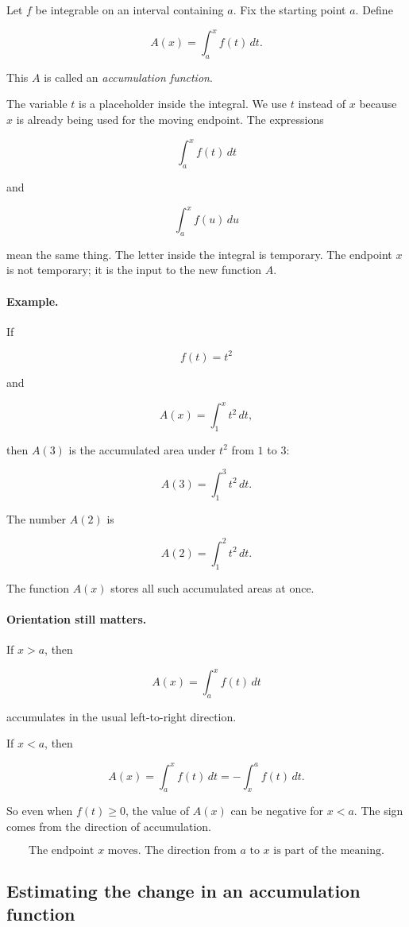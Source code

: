 Let \(f\) be integrable on an interval containing \(a\).  Fix the starting point \(a\).  Define

\[
\boxed{
A(x)=\int_a^x f(t)\,dt.
}
\]

This \(A\) is called an \emph{accumulation function}.

The variable \(t\) is a placeholder inside the integral.  We use \(t\) instead of \(x\)
because \(x\) is already being used for the moving endpoint.  The expressions

\[
\int_a^x f(t)\,dt
\]

and

\[
\int_a^x f(u)\,du
\]

mean the same thing.  The letter inside the integral is temporary.  The endpoint \(x\)
is not temporary; it is the input to the new function \(A\).

\paragraph{Example.}
If

\[
f(t)=t^2
\]

and

\[
A(x)=\int_1^x t^2\,dt,
\]

then \(A(3)\) is the accumulated area under \(t^2\) from \(1\) to \(3\):

\[
A(3)=\int_1^3 t^2\,dt.
\]

The number \(A(2)\) is

\[
A(2)=\int_1^2 t^2\,dt.
\]

The function \(A(x)\) stores all such accumulated areas at once.

\paragraph{Orientation still matters.}
If \(x>a\), then

\[
A(x)=\int_a^x f(t)\,dt
\]

accumulates in the usual left-to-right direction.

If \(x<a\), then

\[
A(x)=\int_a^x f(t)\,dt
=
-\int_x^a f(t)\,dt.
\]

So even when \(f(t)\ge0\), the value of \(A(x)\) can be negative for \(x<a\).  The sign
comes from the direction of accumulation.

\[
\boxed{
\text{The endpoint \(x\) moves.  The direction from \(a\) to \(x\) is part of the meaning.}
}
\]

\subsection{Estimating the change in an accumulation function}
\label{subsec:estimating-change-accumulation-function}


